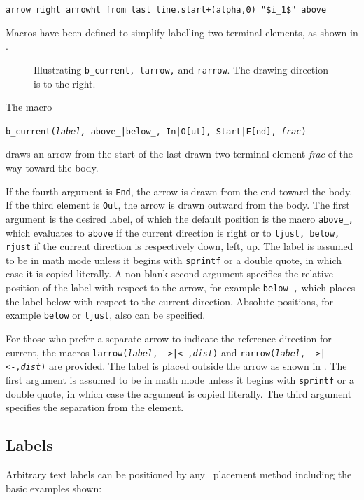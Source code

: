  \verb|arrow right arrowht from last line.start+(alpha,0) "$i_1$" above|

\enlargethispage{\baselineskip}%
Macros have been defined to simplify labelling two-terminal
elements, as shown in .
\begin{figure}[H]
   
   \caption{Illustrating {\tt b\_current, larrow,} and {\tt rarrow}.
      The drawing direction is to the right.}
   \label{currents}
   \end{figure}
The macro

   {\tt b\_current({\sl label,} above\_|below\_, In|O[ut], Start|E[nd],
   {\sl frac})}

\noindent
draws an arrow from the start of the last-drawn two-terminal element
{\sl frac} of the way toward the body.

If the fourth argument is {\tt End}, the arrow is drawn from the end
toward the body.
If the third element is {\tt Out}, the arrow is drawn outward from the body.
The first argument is the desired label, of which the default position is
the macro {\tt above\_,} which evaluates to {\tt above} if the current
direction is right or to {\tt ljust, below, rjust} if the current
direction is respectively down, left, up.  The label is assumed to be
in math mode unless it begins with {\tt sprintf} or a double quote, in which
case it is copied literally.  A non-blank second argument specifies the
relative position of the label with respect to the arrow, for example
{\tt below\_,} which places the label below with respect to the current
direction.  Absolute positions, for example {\tt below} or {\tt ljust},
also can be specified.

For those who prefer a separate arrow to indicate the reference
direction for current, the macros {\tt larrow({\sl label}, ->|<-,{\sl dist})}
and {\tt rarrow({\sl label}, ->|<-,{\sl dist})} are provided.  The label is
placed outside the arrow as shown in .
The first argument is assumed to be in math mode unless
it begins with {\tt sprintf} or a double
quote, in which case the argument is copied literally.
The third argument specifies the separation from the element.

\pagebreak
\subsection{Labels\label{Labels:}}
   Arbitrary text labels
   can be positioned by any \pic\ placement method including the
   basic examples shown:

